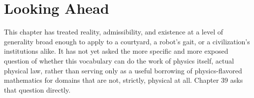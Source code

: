 \section{Looking Ahead}

This chapter has treated reality, admissibility, and existence at a level of generality broad enough to apply to a courtyard, a robot's gait, or a civilization's institutions alike. It has not yet asked the more specific and more exposed question of whether this vocabulary can do the work of physics itself, actual physical law, rather than serving only as a useful borrowing of physics-flavored mathematics for domains that are not, strictly, physical at all. Chapter 39 asks that question directly.
